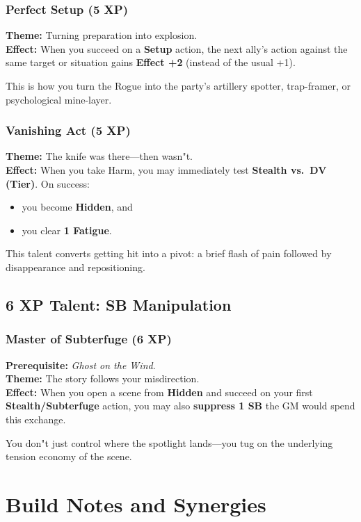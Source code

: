\documentclass[11pt]{book}
\begin{document}
\subsubsection{Perfect Setup (5 XP)}
\textbf{Theme:} Turning preparation into explosion.\\
\textbf{Effect:} When you succeed on a \textbf{Setup} action,
the next ally's action against the same target or situation
gains \textbf{Effect +2} (instead of the usual +1).

This is how you turn the Rogue into the party's artillery spotter,
trap-framer, or psychological mine-layer.

\subsubsection{Vanishing Act (5 XP)}
\textbf{Theme:} The knife was there---then wasn"t.\\
\textbf{Effect:} When you take Harm, you may immediately test
\textbf{Stealth vs.\ DV (Tier)}. On success:
\begin{itemize}
  \item you become \textbf{Hidden}, and
  \item you clear \textbf{1 Fatigue}.
\end{itemize}

This talent converts getting hit into a pivot:
a brief flash of pain followed by disappearance and repositioning.

\subsection{6 XP Talent: SB Manipulation}

\subsubsection{Master of Subterfuge (6 XP)}
\textbf{Prerequisite:} \emph{Ghost on the Wind}.\\
\textbf{Theme:} The story follows your misdirection.\\
\textbf{Effect:} When you open a scene from \textbf{Hidden}
and succeed on your first \textbf{Stealth/Subterfuge} action,
you may also \textbf{suppress 1 SB} the GM would spend this exchange.

You don"t just control where the spotlight lands---you tug on the
underlying tension economy of the scene.

\section{Build Notes and Synergies}
\end{document}
